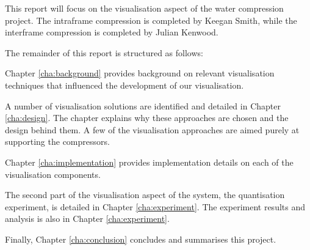 This report will focus on the visualisation aspect of the water compression
project. The intraframe compression is completed by Keegan Smith, while the
interframe compression is completed by Julian Kenwood.

The remainder of this report is structured as follows:

Chapter \ref{cha:background} provides background on relevant visualisation
techniques that influenced the development of our visualisation.

A number of visualisation solutions are identified and detailed in Chapter
\ref{cha:design}. The chapter explains why these approaches are chosen and the
design behind them. A few of the visualisation approaches are aimed purely at
supporting the compressors.

Chapter \ref{cha:implementation} provides implementation details on each of the
visualisation components.

The second part of the visualisation aspect of the system, the quantisation
experiment, is detailed in Chapter \ref{cha:experiment}. The experiment results
and analysis is also in Chapter \ref{cha:experiment}.

Finally, Chapter \ref{cha:conclusion} concludes and summarises this project.


